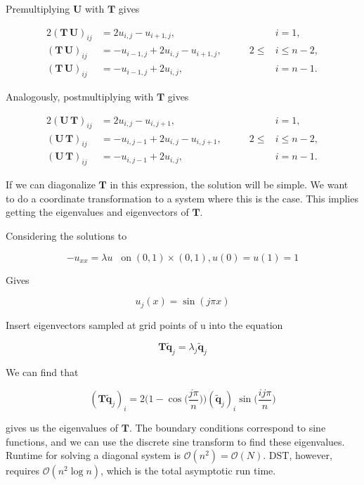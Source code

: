 Premultiplying $\mathbf{U}$ with $\mathbf{T}$ gives

\begin{alignat*}{2}
  (\mathbf{{T}} \, \mathbf{{U}})_{ij} &= 2u_{i,j} - u_{i+1,j}, &\qquad &i=1, \\
  (\mathbf{{T}} \, \mathbf{{U}})_{ij} &= -u_{i-1,j}+2u_{i,j} - u_{i+1,j}, &\qquad 2 \leq &i \leq n-2, \\
  (\mathbf{{T}} \, \mathbf{{U}})_{ij} &= -u_{i-1,j}+2u_{i,j}, &\qquad &i=n-1.
\end{alignat*}

Analogously, postmultiplying with $\mathbf{T}$ gives

\begin{alignat*}{2}
  (\mathbf{{U}} \, \mathbf{{T}})_{ij} &= 2u_{i,j} - u_{i,j+1}, &\qquad &i=1, \\
  (\mathbf{{U}} \, \mathbf{{T}})_{ij} &= -u_{i,j-1}+2u_{i,j} - u_{i,j+1}, &\qquad 2 \leq &i \leq n-2, \\
  (\mathbf{{U}} \, \mathbf{{T}})_{ij} &= -u_{i,j-1}+2u_{i,j}, &\qquad &i=n-1.
\end{alignat*}

If we can diagonalize $\mathbf{T}$ in this expression, the solution will be simple. We want to do a coordinate transformation to a system where this is the case. This implies getting the eigenvalues and eigenvectors of $\mathbf{T}$.

Considering the solutions to 

\begin{equation}
  -u_{xx} = \lambda u \;\;\; \mathrm{on} \; (0, 1) \times (0, 1), u(0) = u(1) = 1
\end{equation}

Gives

\begin{equation}
  u_j(x) = \sin(j \pi x)
\end{equation}

Insert eigenvectors sampled at grid points of u into the equation

\begin{equation}
  \mathbf{T} \tilde{\mathbf{q}}_j = \lambda_j \tilde{\mathbf{q}}_j
\end{equation}

We can find that

\begin{equation}
  (\mathbf{{T}} \mathbf{\widetilde{q}}_j)_i = {{2 \biggl(1-\cos \biggl( \frac{j \pi}{n} \biggr) \biggr) }} {(\mathbf{\widetilde{q}}_j)_i}{{\sin \biggl( \frac{ij \pi}{n}\biggr)}}
\end{equation}

gives us the eigenvalues of $\mathbf{T}$. The boundary conditions correspond to sine functions, and we can use the discrete sine transform to find these eigenvalues. Runtime for solving a diagonal system is $\mathcal{O}(n^2) = \mathcal{O}(N)$. DST, however, requires $\mathcal{O}(n^2 \log n)$, which is the total asymptotic run time.

